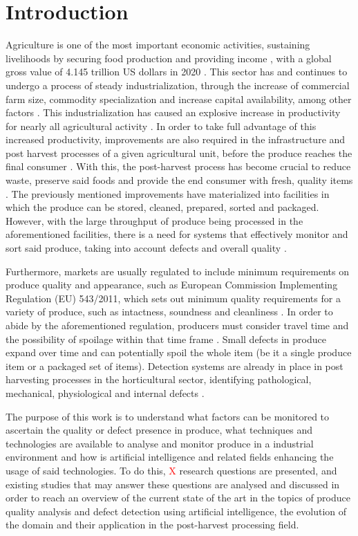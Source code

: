 \documentclass[conference]{IEEEtran}
\begin{document}
\section{Introduction}

Agriculture is one of the most important economic activities, sustaining livelihoods by securing food production and providing income \cite{FDES-1}, with a global gross value of 4.145 trillion US dollars in 2020 \cite{FAO1}. This sector has and continues to undergo a process of steady industrialization, through the increase of commercial farm size, commodity specialization and increase capital availability, among other factors \cite{10.2307/1243439}. This industrialization has caused an explosive increase in productivity for nearly all agricultural activity \cite{owidagriculturalproduction}. In order to take full advantage of this increased productivity, improvements are also required in the infrastructure and post harvest processes of a given agricultural unit, before the produce reaches the final consumer \cite{Food_and_Agriculture_Organization_of_the_United_Nations2010-hb}. With this, the post-harvest process has become crucial to reduce waste, preserve said foods and provide the end consumer with fresh, quality items \cite{foods6010008}. The previously mentioned improvements have materialized into facilities in which the produce can be stored, cleaned, prepared, sorted and packaged. However, with the large throughput of produce being processed in the aforementioned facilities, there is a need for systems that effectively monitor and sort said produce, taking into account defects and overall quality \cite{Mahalik2009}.

Furthermore, markets are usually regulated to include minimum requirements on produce quality and appearance, such as European Commission Implementing Regulation (EU) 543/2011, which sets out minimum quality requirements for a variety of produce, such as intactness, soundness and cleanliness \cite{eu-5432011}. In order to abide by the aforementioned regulation, producers must consider travel time and the possibility of spoilage within that time frame \cite{biv081}. Small defects in produce expand over time and can potentially spoil the whole item (be it a single produce item or a packaged set of items). Detection systems are already in place in post harvesting processes in the horticultural sector, identifying pathological, mechanical, physiological and internal defects \cite{Nturambirwe2020}.

The purpose of this work is to understand what factors can be monitored to ascertain the quality or defect presence in produce, what techniques and technologies are available to analyse and monitor produce in a industrial environment and how is artificial intelligence and related fields enhancing the usage of said technologies. To do this, \textcolor{red}{X} research questions are presented, and existing studies that may answer these questions are analysed and discussed in order to reach an overview of the current state of the art in the topics of produce quality analysis and defect detection using artificial intelligence, the evolution of the domain and their application in the post-harvest processing field.
\end{document}
